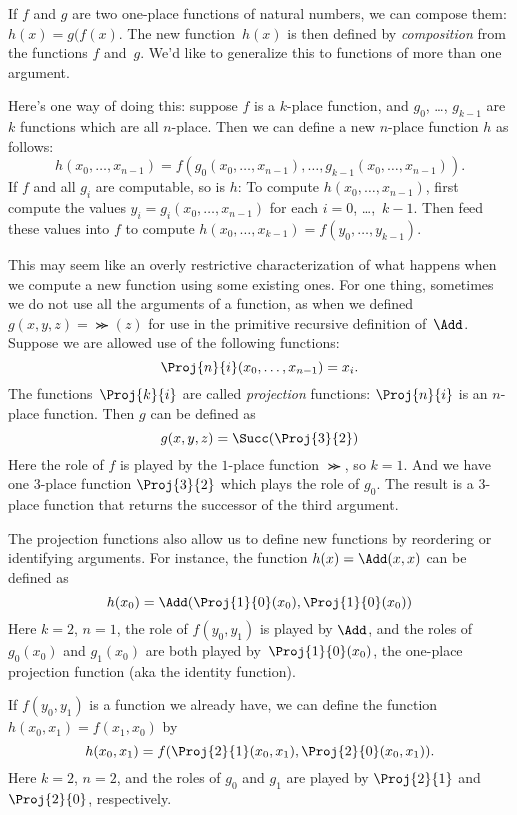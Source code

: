 \documentclass[../../../include/open-logic-section]{subfiles}
\begin{document}

If $f$ and $g$ are two one-place functions of natural numbers, we can
compose them: $h(x) = g(f(x)$. The new
function~$h(x)$ is then defined by \emph{composition} from the
functions $f$ and~$g$. We'd like to generalize this to functions of
more than one argument.

Here's one way of doing this: suppose $f$ is a $k$-place function,
and $g_0$, \dots, $g_{k-1}$ are $k$ functions which are all
$n$-place. Then we can define a new $n$-place function $h$ as follows:
\[
h(x_0, \dots, x_{n-1}) =
f(g_0(x_0, \dots, x_{n-1}), \dots, g_{k-1}(x_0, \dots, x_{n-1})).
\]
If $f$ and all $g_i$ are computable, so is $h$: To compute $h(x_0,
\dots, x_{n-1})$, first compute the values $y_i = g_i(x_0, \dots,
x_{n-1})$ for each $i = 0$, \dots,~$k-1$. Then feed these values into
$f$ to compute $h(x_0, \dots, x_{k-1}) = f(y_0, \dots, y_{k-1})$.

This may seem like an overly restrictive characterization of what
happens when we compute a new function using some existing ones. For
one thing, sometimes we do not use all the arguments of a function, as
when we defined $g(x, y, z) = \Succ(z)$ for use in the primitive
recursive definition of~$\Add$. Suppose we are allowed use of the
following functions:
\[
\Proj{n}{i}(x_0, \dots, x_{n-1}) = x_i.
\]
The functions~$\Proj{k}{i}$ are called \emph{projection} functions:
$\Proj{n}{i}$ is an $n$-place function. Then $g$ can be defined as
\[
g(x, y, z) = \Succ(\Proj{3}{2})
\]
Here the role of $f$ is played by the $1$-place function $\Succ$, so
$k=1$. And we have one $3$-place function $\Proj{3}{2}$ which plays
the role of $g_0$. The result is a $3$-place function that returns the
successor of the third argument.

The projection functions also allow us to define new functions by
reordering or identifying arguments. For instance, the function $h(x)
= \Add(x, x)$ can be defined as
\[
h(x_0) = \Add(\Proj{1}{0}(x_0),\Proj{1}{0}(x_0))
\]
Here $k=2$, $n=1$, the role of $f(y_0,y_1)$ is played by $\Add$, and
the roles of $g_0(x_0)$ and $g_1(x_0)$ are both played
by~$\Proj{1}{0}(x_0)$, the one-place projection function (aka the
identity function).

If $f(y_0, y_1)$ is a function we already have, we can define the
function $h(x_0, x_1) = f(x_1, x_0)$ by
\[
h(x_0, x_1) = f(\Proj{2}{1}(x_0, x_1),\Proj{2}{0}(x_0, x_1)).
\]
Here $k=2$, $n = 2$, and the roles of $g_0$ and $g_1$ are played by
$\Proj{2}{1}$ and~$\Proj{2}{0}$, respectively.
\end{document}

